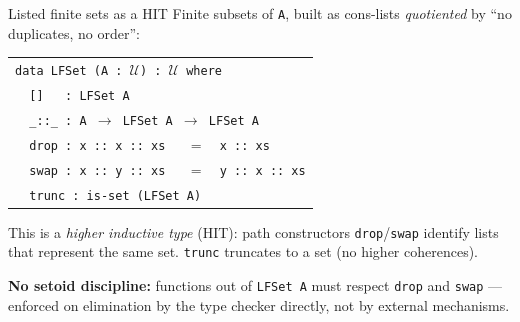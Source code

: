 \documentclass[aspectratio=169,12pt]{beamer}
\begin{document}
\begin{frame}{Listed finite sets as a HIT}
  Finite subsets of \texttt{A}, built as cons-lists
  \emph{quotiented} by ``no duplicates, no order'':
  \medskip

  \begin{center}
  \begin{tabular}{l}
  \texttt{data LFSet (A : $\mathcal{U}$) : $\mathcal{U}$ where}\\
  \texttt{\ \ []\ \ \ : LFSet A}\\
  \texttt{\ \ \_::\_\ : A $\to$ LFSet A $\to$ LFSet A}\\
  \texttt{\ \ drop\ : x :: x :: xs\ \ \ $=$\ \ x :: xs}\\
  \texttt{\ \ swap\ : x :: y :: xs\ \ \ $=$\ \ y :: x :: xs}\\
  \texttt{\ \ trunc : is-set (LFSet A)}
  \end{tabular}
  \end{center}
  \pause\medskip

  This is a \emph{higher inductive type} (HIT): path constructors \texttt{drop}/\texttt{swap} identify lists that
  represent the same set. \texttt{trunc} truncates to a set
  (no higher coherences).

  \pause\medskip
  \textbf{No setoid discipline:} functions out of \texttt{LFSet A} must
  respect \texttt{drop} and \texttt{swap} --- enforced on elimination by the type checker directly,
  not by external mechanisms.
\end{frame}
\end{document}
